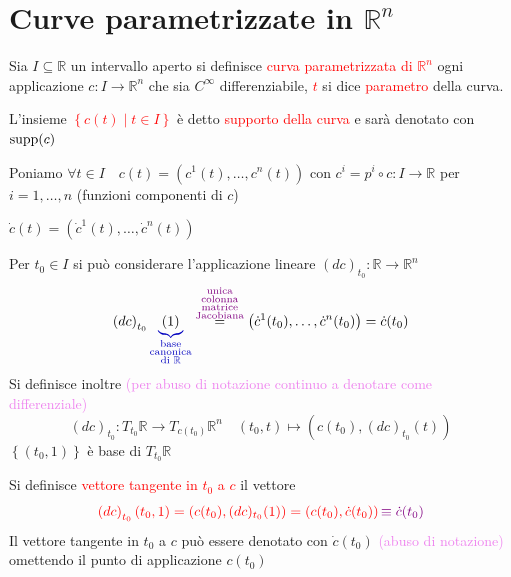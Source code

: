     \section{Curve parametrizzate in \texorpdfstring{$\mathbb{R}^n$}{R\textasciicircum n}}
        \begin{definizione}
        Sia $I \subseteq \mathbb{R}$ un intervallo aperto si definisce \textcolor{red}{curva parametrizzata di $\mathbb{R}^n$} 
        ogni applicazione $c: I \to \mathbb{R}^n$ che sia $C^{\infty}$ differenziabile, \textcolor{red}{$t$} si dice \textcolor{red}{parametro} della curva.

        L'insieme \textcolor{red}{$\left\{c(t) \mid t \in I \right\}$} è detto \textcolor{red}{supporto della curva} e sarà denotato con \textcolor{red}{$\operatorname{supp}(c)$}

        Poniamo $\forall t \in I \quad c(t)= (c^1(t),\ldots,c^n(t))$ con $c^i= p^i \circ c: I \to \mathbb{R}$ per $i=1,\ldots,n$ \textcolor{blu}{(funzioni componenti di $c$)}
        
        $\dot{c}(t)= (\dot{c}^1(t),\ldots,\dot{c}^n(t))$

        Per $t_0 \in I$ si può considerare l'applicazione lineare $\left(dc\right)_{t_0}: \mathbb{R} \to \mathbb{R}^n$ 
        \[ \left(dc\right)_{t_0} \textcolor{blu}{\underbrace{\textcolor{black}{(1)}}_{\substack{\text{base} \\ \text{canonica} \\ \text{di } \mathbb{R}}}} \overset{\textcolor{violet}{\substack{\text{unica} \\ \text{colonna} \\ \text{matrice} \\ \text{Jacobiana}}}}{=} \left(\dot{c}^1(t_0), \ldots, \dot{c}^n(t_0) \right) = \dot{c}(t_0) \] 
        Si definisce inoltre \textcolor{violet}{(per abuso di notazione continuo a denotare come differenziale)}
        \[ \left(dc\right)_{t_0}: T_{t_0} \mathbb{R} \to T_{c(t_0)} \mathbb{R}^n \quad \left(t_0,t\right) \mapsto \left(c(t_0), (dc)_{t_0} (t) \right) \]
        $\left\{(t_0,1)\right\}$ è base di $T_{t_0} \mathbb{R}$ 

        Si definisce \textcolor{red}{vettore tangente in $t_0$ a $c$} il vettore
        \[ \textcolor{red}{\left(dc\right)_{t_0} (t_0,1) = \left( c(t_0), (dc)_{t_0}(1) \right) = \left(c(t_0), \dot{c}(t_0) \right)} \, \textcolor{violet}{\equiv \dot{c}(t_0)} \]
        Il vettore tangente in $t_0$ a $c$ può essere denotato con $\dot{c}(t_0)$ \textcolor{violet}{(abuso di notazione)} omettendo il punto di applicazione $c(t_0)$  
        \end{definizione}
